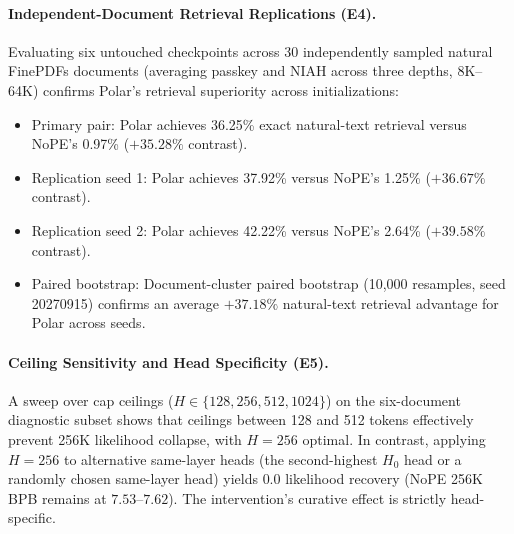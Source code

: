\paragraph{Independent-Document Retrieval Replications (E4).}
Evaluating six untouched checkpoints across 30 independently sampled natural FinePDFs documents (averaging passkey and NIAH across three depths, 8K--64K) confirms Polar's retrieval superiority across initializations:
\begin{itemize}
  \item Primary pair: Polar achieves 36.25\% exact natural-text retrieval versus NoPE's 0.97\% ($+35.28\%$ contrast).
  \item Replication seed 1: Polar achieves 37.92\% versus NoPE's 1.25\% ($+36.67\%$ contrast).
  \item Replication seed 2: Polar achieves 42.22\% versus NoPE's 2.64\% ($+39.58\%$ contrast).
  \item Paired bootstrap: Document-cluster paired bootstrap (10,000 resamples, seed 20270915) confirms an average $+37.18\%$ natural-text retrieval advantage for Polar across seeds.
\end{itemize}

\paragraph{Ceiling Sensitivity and Head Specificity (E5).}
A sweep over cap ceilings ($H \in \{128, 256, 512, 1024\}$) on the six-document diagnostic subset shows that ceilings between 128 and 512 tokens effectively prevent 256K likelihood collapse, with $H=256$ optimal. In contrast, applying $H=256$ to alternative same-layer heads (the second-highest $H_0$ head or a randomly chosen same-layer head) yields $0.0$ likelihood recovery (NoPE 256K BPB remains at $7.53$--$7.62$). The intervention's curative effect is strictly head-specific.

